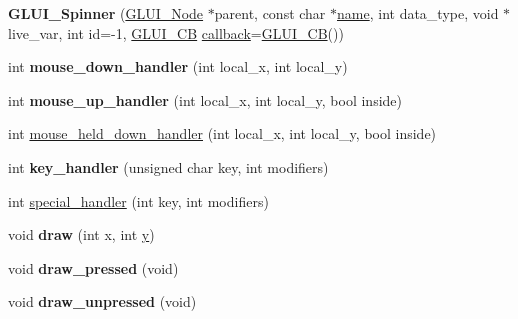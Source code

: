 \begin{DoxyCompactItemize}
\item 
\hypertarget{class_g_l_u_i___spinner_ac78385b3436ef915b5e706f1f1b19b49}{{\bfseries G\+L\+U\+I\+\_\+\+Spinner} (\hyperlink{class_g_l_u_i___node}{G\+L\+U\+I\+\_\+\+Node} $\ast$parent, const char $\ast$\hyperlink{class_g_l_u_i___control_aa95b97d50df45335fc33f0af03958eb3}{name}, int data\+\_\+type, void $\ast$live\+\_\+var, int id=-\/1, \hyperlink{class_g_l_u_i___c_b}{G\+L\+U\+I\+\_\+\+C\+B} \hyperlink{class_g_l_u_i___control_a96060fe0cc6d537e736dd6eef78e24ab}{callback}=\hyperlink{class_g_l_u_i___c_b}{G\+L\+U\+I\+\_\+\+C\+B}())}\label{class_g_l_u_i___spinner_ac78385b3436ef915b5e706f1f1b19b49}

\item 
\hypertarget{class_g_l_u_i___spinner_aa88057ac6073205f9e1509cad08e6b0b}{int {\bfseries mouse\+\_\+down\+\_\+handler} (int local\+\_\+x, int local\+\_\+y)}\label{class_g_l_u_i___spinner_aa88057ac6073205f9e1509cad08e6b0b}

\item 
\hypertarget{class_g_l_u_i___spinner_a85650009d91d672e3c192f60760b1704}{int {\bfseries mouse\+\_\+up\+\_\+handler} (int local\+\_\+x, int local\+\_\+y, bool inside)}\label{class_g_l_u_i___spinner_a85650009d91d672e3c192f60760b1704}

\item 
int \hyperlink{class_g_l_u_i___spinner_aae95829438240c9b6a293905356e322c}{mouse\+\_\+held\+\_\+down\+\_\+handler} (int local\+\_\+x, int local\+\_\+y, bool inside)
\item 
\hypertarget{class_g_l_u_i___spinner_a29dd55ebbd9967c508b0d6aad85d209a}{int {\bfseries key\+\_\+handler} (unsigned char key, int modifiers)}\label{class_g_l_u_i___spinner_a29dd55ebbd9967c508b0d6aad85d209a}

\item 
int \hyperlink{class_g_l_u_i___spinner_a22e78681f3b47b2b5436686ad23523bb}{special\+\_\+handler} (int key, int modifiers)
\item 
\hypertarget{class_g_l_u_i___spinner_ab2b6082a468a3cf5fd720dda38460230}{void {\bfseries draw} (int x, int \hyperlink{_ice_utils_8h_aa7ffaed69623192258fb8679569ff9ba}{y})}\label{class_g_l_u_i___spinner_ab2b6082a468a3cf5fd720dda38460230}

\item 
\hypertarget{class_g_l_u_i___spinner_add363e211d0f0638ce83cefe18853ec5}{void {\bfseries draw\+\_\+pressed} (void)}\label{class_g_l_u_i___spinner_add363e211d0f0638ce83cefe18853ec5}

\item 
\hypertarget{class_g_l_u_i___spinner_a7e2a6eab40bb6cd68732ae9a3a3eb1bc}{void {\bfseries draw\+\_\+unpressed} (void)}\label{class_g_l_u_i___spinner_a7e2a6eab40bb6cd68732ae9a3a3eb1bc}


\end{DoxyCompactItemize}
